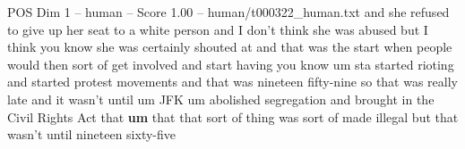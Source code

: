 \begin{textsample}{POS Dim 1 – human – Score 1.00 – human/t000322\_human.txt}  \label{ex:f1_pos_004}
and she refused to give up her seat to a white person and I don't think she was abused but I think you know she was certainly shouted at and that was the start when people would then sort of get involved and start having you know um sta started rioting and started protest movements and that was nineteen fifty-nine so that was really late and it wasn't until um JFK um abolished segregation and brought in the Civil Rights Act that \textbf{um} that that sort of thing was sort of made illegal but that wasn't until nineteen sixty-five

\end{textsample}
